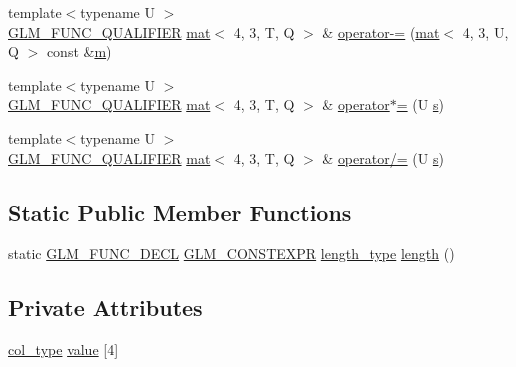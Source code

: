 \begin{DoxyCompactItemize}
{\footnotesize template$<$typename U $>$ }\\\mbox{\hyperlink{setup_8hpp_a33fdea6f91c5f834105f7415e2a64407}{G\+L\+M\+\_\+\+F\+U\+N\+C\+\_\+\+Q\+U\+A\+L\+I\+F\+I\+ER}} \mbox{\hyperlink{structglm_1_1mat}{mat}}$<$ 4, 3, T, Q $>$ \& \mbox{\hyperlink{structglm_1_1mat_3_014_00_013_00_01_t_00_01_q_01_4_a6c96adf119836504e44d2050869b7d8b}{operator-\/=}} (\mbox{\hyperlink{structglm_1_1mat}{mat}}$<$ 4, 3, U, Q $>$ const \&\mbox{\hyperlink{_s_d_l__opengl__glext_8h_af593500c283bf1a787a6f947f503a5c2}{m}})
\item 
{\footnotesize template$<$typename U $>$ }\\\mbox{\hyperlink{setup_8hpp_a33fdea6f91c5f834105f7415e2a64407}{G\+L\+M\+\_\+\+F\+U\+N\+C\+\_\+\+Q\+U\+A\+L\+I\+F\+I\+ER}} \mbox{\hyperlink{structglm_1_1mat}{mat}}$<$ 4, 3, T, Q $>$ \& \mbox{\hyperlink{structglm_1_1mat_3_014_00_013_00_01_t_00_01_q_01_4_a4b3846610c3a67636b062fdeeee42243}{operator$\ast$=}} (U \mbox{\hyperlink{_s_d_l__opengl_8h_a4af680a6c683f88ed67b76f207f2e6e4}{s}})
\item 
{\footnotesize template$<$typename U $>$ }\\\mbox{\hyperlink{setup_8hpp_a33fdea6f91c5f834105f7415e2a64407}{G\+L\+M\+\_\+\+F\+U\+N\+C\+\_\+\+Q\+U\+A\+L\+I\+F\+I\+ER}} \mbox{\hyperlink{structglm_1_1mat}{mat}}$<$ 4, 3, T, Q $>$ \& \mbox{\hyperlink{structglm_1_1mat_3_014_00_013_00_01_t_00_01_q_01_4_ac85c9c099e9e7c43a4f04ae0c39582bd}{operator/=}} (U \mbox{\hyperlink{_s_d_l__opengl_8h_a4af680a6c683f88ed67b76f207f2e6e4}{s}})
\end{DoxyCompactItemize}
\subsection*{Static Public Member Functions}
\begin{DoxyCompactItemize}
\item 
static \mbox{\hyperlink{setup_8hpp_ab2d052de21a70539923e9bcbf6e83a51}{G\+L\+M\+\_\+\+F\+U\+N\+C\+\_\+\+D\+E\+CL}} \mbox{\hyperlink{setup_8hpp_a08b807947b47031d3a511f03f89645ad}{G\+L\+M\+\_\+\+C\+O\+N\+S\+T\+E\+X\+PR}} \mbox{\hyperlink{structglm_1_1mat_3_014_00_013_00_01_t_00_01_q_01_4_a24f0f2085bebe0a6e79da267368e74f5}{length\+\_\+type}} \mbox{\hyperlink{structglm_1_1mat_3_014_00_013_00_01_t_00_01_q_01_4_a3f28efbb3e6be20443f461a6261ae631}{length}} ()
\end{DoxyCompactItemize}
\subsection*{Private Attributes}
\begin{DoxyCompactItemize}
\item 
\mbox{\hyperlink{structglm_1_1mat_3_014_00_013_00_01_t_00_01_q_01_4_ab7cb76d6290691108c8af724270e3b6c}{col\+\_\+type}} \mbox{\hyperlink{structglm_1_1mat_3_014_00_013_00_01_t_00_01_q_01_4_ad14b8b7424e4b4cadee7d85cedc61b7a}{value}} \mbox{[}4\mbox{]}
\end{DoxyCompactItemize}


